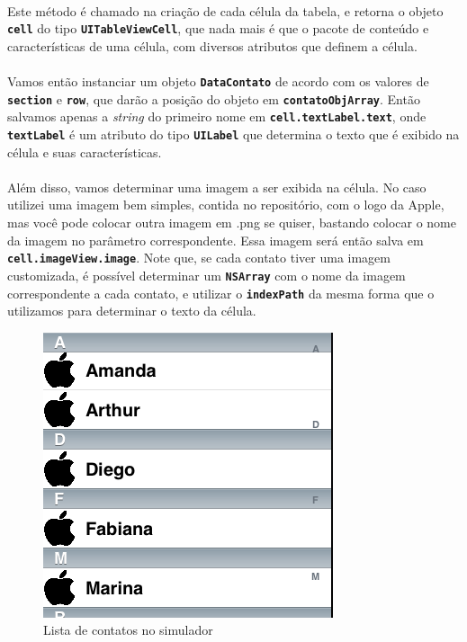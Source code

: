 \documentclass[a4paper,12pt,brazil,doubleside]{book}
\begin{document}
\paragraph{}Este método é chamado na criação de cada célula da tabela, e retorna o objeto \texttt{\textbf{cell}} do tipo \texttt{\textbf{UITableViewCell}}, que nada mais é que o pacote de conteúdo e características de uma célula, com diversos atributos que definem a célula.
\paragraph{}Vamos então instanciar um objeto \texttt{\textbf{DataContato}} de acordo com os valores de \texttt{\textbf{section}} e \texttt{\textbf{row}}, que darão a posição do objeto em \texttt{\textbf{contatoObjArray}}. Então salvamos apenas a \emph{string} do primeiro nome em \texttt{\textbf{cell.textLabel.text}}, onde \texttt{\textbf{textLabel}} é um atributo do tipo \texttt{\textbf{UILabel}} que determina o texto que é exibido na célula e suas características.
\paragraph{}Além disso, vamos determinar uma imagem a ser exibida na célula. No caso utilizei uma imagem bem simples, contida no repositório, com o logo da Apple, mas você pode colocar outra imagem em .png se quiser, bastando colocar o nome da imagem no parâmetro correspondente. Essa imagem será então salva em \texttt{\textbf{cell.imageView.image}}. Note que, se cada contato tiver uma imagem customizada, é possível determinar um \texttt{\textbf{NSArray}} com o nome da imagem correspondente a cada contato, e utilizar o \texttt{\textbf{indexPath}} da mesma forma que o utilizamos para determinar o texto da célula.

\begin{figure}[h]
  \centering
  \includegraphics[totalheight=0.4\textheight]{figuras/table/table3.png}
  \caption{Lista de contatos no simulador}
  \label{fig:a}
\end{figure}
\end{document}

